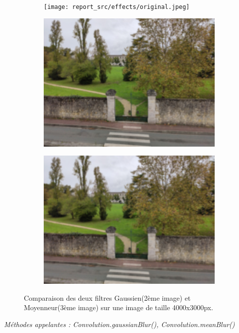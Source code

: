         \begin{figure}[!h]
            \centering
            \begin{subfigure}[b]{0.3\textwidth}
                \texttt{[image: report\_src/effects/original.jpeg]}
            \end{subfigure}
            \begin{subfigure}[b]{0.3\textwidth}
                \includegraphics[width=1\textwidth]{report_src/effects/blur.jpeg}
            \end{subfigure}
            \begin{subfigure}[b]{0.3\textwidth}
                \includegraphics[width=1\textwidth]{report_src/effects/mean.jpeg}
            \end{subfigure}
            \caption*{Comparaison des deux filtres Gaussien(2ème image) et Moyenneur(3ème image) sur une image de taille 4000x3000px.}
        \end{figure} 
        \emph{Méthodes appelantes : Convolution.gaussianBlur(), Convolution.meanBlur()}

